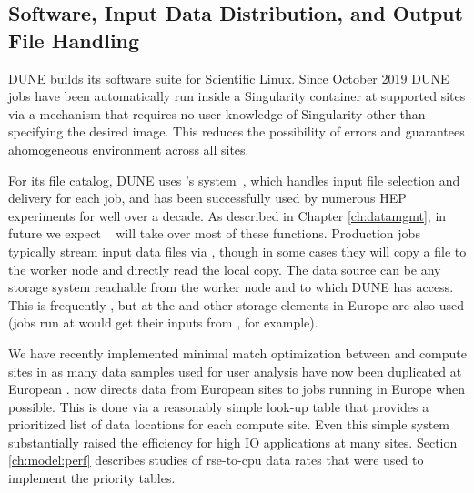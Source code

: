 \documentclass[../main-v1.tex]{subfiles}
\begin{document}
\subsection{%
Software, Input Data Distribution, and Output File Handling}
\label{subsec:io}
DUNE builds its software suite for  Scientific Linux. Since October 2019 DUNE jobs %
have been automatically run inside a Singularity container at supported sites via a  mechanism that requires no user knowledge of Singularity other than specifying the desired image. This %
reduces the possibility of errors and guarantees ahomogeneous environment across all sites.

For its file catalog, DUNE uses 's  system~\cite{Illingworth:2014mba}, which handles input file selection and delivery for each job, and has been successfully used by numerous HEP experiments for well over a decade. As described in Chapter \ref{ch:datamgmt},  in future we expect ~\cite{Barisits:2019fyl} will  take over most of these functions. Production jobs typically stream input data files via , though in some cases they will copy a file to the worker node and directly read the local copy. The data source can be any storage system reachable from the worker
node and to which DUNE has access. This is frequently  , but  at the  and other storage elements in Europe are also used (jobs run at  would get their inputs from  , for example). 

We have recently implemented minimal match optimization between  and compute sites in  as many data samples used for user analysis have now been duplicated at European .   now directs data from European sites to jobs running in Europe when possible.  This is done via a reasonably simple look-up table that provides a prioritized list of data locations for each compute site.  Even this simple system substantially raised the efficiency for high IO applications at many sites. Section \ref{ch:model:perf} describes studies of rse-to-cpu data rates that were used to implement the priority tables. 
\end{document}
